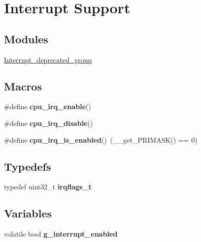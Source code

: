 \hypertarget{group__interrupt__group}{}\section{Interrupt Support}
\label{group__interrupt__group}
\subsection*{Modules}
\begin{DoxyCompactItemize}
\item 
\mbox{\hyperlink{group__interrupt__deprecated__group}{Interrupt\+\_\+deprecated\+\_\+group}}
\end{DoxyCompactItemize}
\subsection*{Macros}
\begin{DoxyCompactItemize}
\item 
\#define {\bfseries cpu\+\_\+irq\+\_\+enable}()
\item 
\#define {\bfseries cpu\+\_\+irq\+\_\+disable}()
\item 
\mbox{\label{group__interrupt__group_gae1545a2473614564550b9c4015c94978}} 
\#define {\bfseries cpu\+\_\+irq\+\_\+is\+\_\+enabled}()~(\+\_\+\+\_\+get\+\_\+\+P\+R\+I\+M\+A\+SK() == 0)
\end{DoxyCompactItemize}
\subsection*{Typedefs}
\begin{DoxyCompactItemize}
\item 
\mbox{\label{group__interrupt__group_ga6cb555807af15bd10cbcc4101ab840c7}} 
typedef uint32\+\_\+t {\bfseries irqflags\+\_\+t}
\end{DoxyCompactItemize}
\subsection*{Variables}
\begin{DoxyCompactItemize}
\item 
\mbox{\label{group__interrupt__group_ga18a272af1cdb2009183461e1647f4e86}} 
volatile bool {\bfseries g\+\_\+interrupt\+\_\+enabled}
\end{DoxyCompactItemize}
